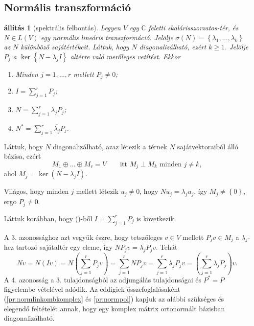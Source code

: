 \documentclass[a4paper, showtrims]{memoir}
\makeatletter
\renewenvironment{proof}[1][\proofname]
    {\par\pushQED{\qed}%
    \normalfont \topsep6\p@\@plus6\p@\relax
    \trivlist
    \item[\hskip\labelsep
        \itshape
    #1\@addpunct{:}]\ignorespaces}
    {\popQED\endtrivlist\@endpefalse}
\theoremstyle{plain}
\newtheorem{proposition}{állítás}[chapter]
\theoremstyle{remark}
\theoremstyle{definition}
\makeatother
\begin{document}
\subsection{Normális transzformáció}
\begin{proposition}[spektrális felbontás]
	Legyen $V$ egy $\mathbb{C}$ feletti skalárisszorzatos-tér, és $N\in L\left( V \right)$
	egy normális lineáris transzformáció.
	Jelölje $\sigma\left( N \right)=\left\{\lambda_1,\ldots,\lambda_k  \right\}$ az $N$ különböző sajátértékeit.
	Láttuk, hogy $N$ diagonalizálható, ezért $k\geq 1$.
	Jelölje $P_j$ a $\ker\left\{ N-\lambda_jI \right\}$ altérre való merőleges vetítést.
	Ekkor
	\begin{enumerate}
		\item Minden $j=1,\ldots,r$ mellett $P_j\neq 0$;
		\item $I=\sum_{j=1}^rP_j$;
		\item $N=\sum_{j=1}^r\lambda_jP_j$;
		\item $N^\ast=\sum_{j=1}^r\overline{\lambda_j}P_j$.
		      \qedhere
	\end{enumerate}
\end{proposition}
\begin{proof}
	Láttuk, hogy $N$ diagonalizálható, azaz létezik a térnek $N$ sajátvektoraiból álló
	bázisa,
	ezért
	\[
		M_1\oplus\dots\oplus M_r=V
		\qquad\text{itt }M_j\perp M_k\text{ minden }j\neq k,\tag{\dag}
	\]
	ahol $M_j=\ker\left( N-\lambda_jI \right)$.

	Világos,
	hogy minden $j$ mellett létezik $u_j\neq 0$, hogy $Nu_j=\lambda_ju_j$,
	így $M_j\neq \left\{ 0 \right\}$,
	ergo $P_j\neq 0.$

	Láttuk korábban, hogy (\dag)-ből $I=\sum_{j=1}^{r}P_j$ is következik.

	A 3. azonossághoz azt vegyük észre,
	hogy tetszőleges $v\in V$ mellett $P_jv\in M_j$ a $\lambda_j$-hez tartozó sajátaltér egy eleme,
	így $NP_jv=\lambda_jP_jv$. Tehát
	\[
		Nv
		=
		N\left( Iv \right)
		=
		N\left( \sum_{j=1}^rP_jv \right)
		=
		\sum_{j=1}^rNP_jv
		=
		\sum_{j=1}^r\lambda_jP_jv
		=
		\left( \sum_{j=1}^r\lambda_jP_j \right)v.
	\]
	A 4. azonosság a 3. tulajdonságból az adjungálás tulajdonságai és $P^\ast=P$ figyelembe vételével adódik.
\end{proof}
Az eddigiek összefoglalásaként (\ref{pr:normlinkombkomplex} és \ref{pr:normpol}) kapjuk az alábbi szükséges és elegendő feltételét annak,
hogy egy komplex mátrix ortonormált bázisban diagonalizálható.
\end{document}
